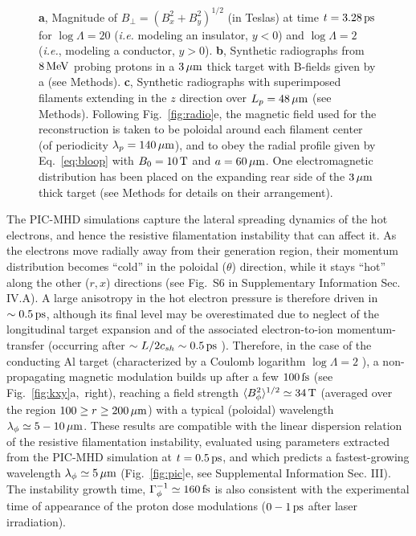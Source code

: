 \documentclass[aps,twocolumn,showpacs,superscriptaddress]{revtex4}
\begin{document}
\begin{figure}
{\textbf{a}, Magnitude of $B_\perp=(B_x^2+B_y^2)^{1/2}$ (in Teslas) at time $t=3.28\,\rm ps$ for $\log \Lambda=20$ (\emph{i.e.} modeling an insulator, $y<0$) and $\log\Lambda=2$ (\emph{i.e.}, modeling a conductor, $y>0$).
\textbf{b}, Synthetic radiographs from $8\,\rm MeV$ probing protons in a 
$3\,\rm \mu m$ thick target with B-fields given by a (see Methods).
\textbf{c}, Synthetic radiographs with superimposed filaments extending in the $z$ direction over $L_p = 48\,\rm \mu m$ (see Methods).
Following Fig.~\ref{fig:radio}e, the magnetic field used for the reconstruction is taken to be poloidal around each filament center (of periodicity $\lambda_p = 140\,\rm \mu m$), and to obey the radial profile given by Eq.~\eqref{eq:bloop} with $B_0=10\,\rm T$ and $a = 60\,\rm \mu m$. One electromagnetic distribution has been placed on the expanding rear side of the $3\,\rm \mu m$ thick target (see Methods for details on their arrangement).}
\end{figure}

The PIC-MHD simulations capture the lateral spreading dynamics of the hot electrons, and hence the resistive filamentation instability that can affect it. As the electrons move radially away from their generation region, their momentum distribution becomes ``cold'' in the poloidal ($\theta$) direction, while it stays ``hot'' along the other ($r,x$) directions (see Fig.~S6 in Supplementary Information Sec. IV.A). A large anisotropy in the hot electron pressure is therefore driven in $\sim 0.5\,\rm ps$, although its final level may be overestimated due to neglect of the longitudinal target expansion and of the associated electron-to-ion momentum-transfer (occurring after $\sim L/2c_{sh} \sim 0.5\,\rm ps$ \cite{PRE_Mora_2005}). Therefore, in the case of the conducting Al target (characterized by a Coulomb logarithm $\log \Lambda = 2$ \cite{POF_Lee_1984}), a non-propagating magnetic modulation builds up after a few $100\,\rm fs$ (see \mbox{Fig.~\ref{fig:kxy}a, right}), reaching a field strength $\langle B_\phi^2\rangle^{1/2}\simeq 34\,\rm T$ (averaged over the region $100 \ge r \ge 200\,\mu \rm m$) with a typical (poloidal) wavelength $\lambda_\phi \simeq 5-10\,\rm \mu m$. These results are compatible with the linear dispersion relation of the resistive filamentation instability, evaluated using parameters extracted from the PIC-MHD simulation at $t=0.5\,\rm ps$, and which predicts a fastest-growing wavelength $\lambda_\phi \simeq 5\,\mu \rm m$ (Fig.~\ref{fig:pic}e, see Supplemental Information Sec. III). The instability growth time, $\Gamma_\phi^{-1}\simeq 160\,\rm fs$ is also consistent with the experimental time of appearance of the proton dose modulations ($0-1\,\rm ps$ after laser irradiation).
\end{document}

